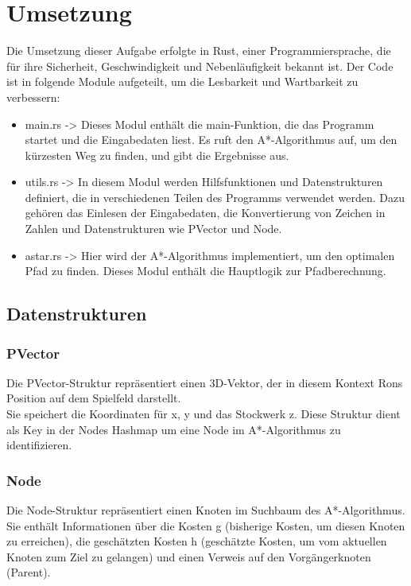 \section{Umsetzung}
Die Umsetzung dieser Aufgabe erfolgte in Rust, einer Programmiersprache, die für ihre Sicherheit, Geschwindigkeit und Nebenläufigkeit bekannt ist.
Der Code ist in folgende Module aufgeteilt, um die Lesbarkeit und Wartbarkeit zu verbessern:
\begin{itemize}
    \item main.rs ->
          Dieses Modul enthält die main-Funktion, die das Programm startet und die Eingabedaten liest.
          Es ruft den A*-Algorithmus auf, um den kürzesten Weg zu finden, und gibt die Ergebnisse aus.

    \item utils.rs ->
          In diesem Modul werden Hilfsfunktionen und Datenstrukturen definiert, die in verschiedenen Teilen des Programms verwendet werden.
          Dazu gehören das Einlesen der Eingabedaten, die Konvertierung von Zeichen in Zahlen und Datenstrukturen wie PVector und Node.

    \item astar.rs ->
          Hier wird der A*-Algorithmus implementiert, um den optimalen Pfad zu finden.
          Dieses Modul enthält die Hauptlogik zur Pfadberechnung.
\end{itemize}

\subsection{Datenstrukturen}
\subsubsection*{PVector}
Die PVector-Struktur repräsentiert einen 3D-Vektor, der in diesem Kontext Rons Position auf dem Spielfeld darstellt.\\
Sie speichert die Koordinaten für x, y und das Stockwerk z.
Diese Struktur dient als Key in der Nodes Hashmap um eine Node im A*-Algorithmus zu identifizieren.
\subsubsection*{Node}
Die Node-Struktur repräsentiert einen Knoten im Suchbaum des A*-Algorithmus. \\
Sie enthält Informationen über die Kosten g (bisherige Kosten, um diesen Knoten zu erreichen),
die geschätzten Kosten h (geschätzte Kosten, um vom aktuellen Knoten zum Ziel zu gelangen)
und einen Verweis auf den Vorgängerknoten (Parent).

